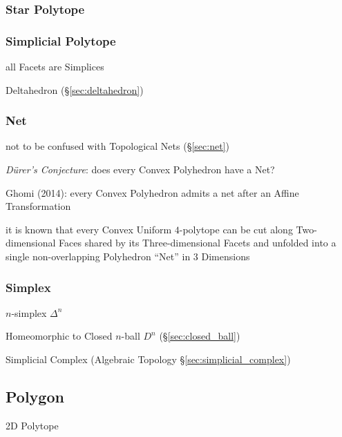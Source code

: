 \subsubsection{Star Polytope}\label{sec:star_polytope}

\subsubsection{Simplicial Polytope}\label{sec:simplicial_polytope}

all Facets are Simplices

Deltahedron (\S\ref{sec:deltahedron})



\subsubsection{Net}\label{sec:polytope_net}

\fist not to be confused with Topological Nets (\S\ref{sec:net})

\emph{D\"urer's Conjecture}: does every Convex Polyhedron have a Net?

Ghomi (2014): every Convex Polyhedron admits a net after an Affine
Transformation

it is known that every Convex Uniform $4$-polytope can be cut along
Two-dimensional Faces shared by its Three-dimensional Facets and unfolded into
a single non-overlapping Polyhedron ``Net'' in $3$ Dimensions



\subsubsection{Simplex}\label{sec:simplex}

$n$-simplex $\Delta^n$

Homeomorphic to Closed $n$-ball $D^n$ (\S\ref{sec:closed_ball})

\fist Simplicial Complex (Algebraic Topology \S\ref{sec:simplicial_complex})



\subsection{Polygon}\label{sec:polygon}

2D Polytope

